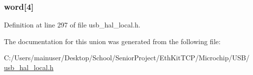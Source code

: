 \hypertarget{union___b_u_f_f_e_r___d_e_s_c_r_i_p_t_o_r_a705536d4baff017681ac12a95f7f76ef}{}
\subsubsection[{word}]{ word\mbox{[}4\mbox{]}}\label{union___b_u_f_f_e_r___d_e_s_c_r_i_p_t_o_r_a705536d4baff017681ac12a95f7f76ef}


Definition at line 297 of file usb\+\_\+hal\+\_\+local.\+h.



The documentation for this union was generated from the following file\+:\begin{DoxyCompactItemize}
\item 
C\+:/\+Users/mainuser/\+Desktop/\+School/\+Senior\+Project/\+Eth\+Kit\+T\+C\+P/\+Microchip/\+U\+S\+B/\hyperlink{usb__hal__local_8h}{usb\+\_\+hal\+\_\+local.\+h}\end{DoxyCompactItemize}
